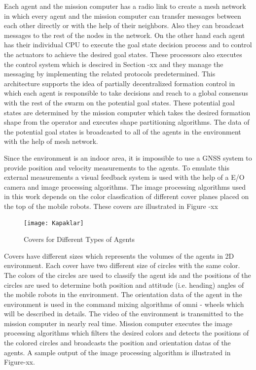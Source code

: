 \documentclass[twoside]{article}
\begin{document}
Each agent and the mission computer has a radio link to create a mesh network in which every agent and the mission computer can transfer messages between each other directly or with the help of their neighbors. Also they can broadcast messages to the rest of the nodes in the network.  On the other hand each agent has their individual CPU to execute the goal state decision process and to control the actuators to achieve the desired goal states. These processors also executes the control system which is descired in Section -xx and they manage the messaging by implementing the related protocols predetermined.  This architecture supports the idea of partially decentralized formation control in which each agent is responsible to take decisions and reach to a global consensus with the rest of the swarm on the potential goal states.  These potential goal states are determined by the mission computer which takes the desired formation shape from the operator and executes shape partitioning algorithms. The data of the potential goal states is broadcasted to all of the agents in the environment with the help of mesh network. 

Since the environment is an indoor area, it is impossible to use a GNSS system to provide position and velocity measurements to the agents. To emulate this external measurements a visual feedback system is used with the help of a E/O camera and image processing algorithms.  The image processing algorithms used in this work depends on the color classfication of different cover planes placed on the top of the mobile robots. These covers are illustrated in Figure -xx


		
			\begin{figure}[H]
				\caption{Covers for Different Types of Agents}
				\centerline{\texttt{[image: Kapaklar]}}
			\end{figure} 
		
		
		Covers have different sizes which represents the volumes of the agents in 2D environment. Each cover have two different size of circles with the same color. The colors of the circles are used to classify the agent ids and the positions of the circles are used to determine both position and attitude (i.e. heading) angles of the mobile robots in the environment. The orientation data of the agent in the environment is used in the command mixing algorithms of omni - wheels which will be described in details. The video of the environment is transmitted to the mission computer in nearly real time. Mission computer executes the image processing algorithms which filters the desired colors and detects the positions of the colored circles and broadcasts the position and orientation datas of the agents. A sample output of the image processing algorithm is illustrated in Figure-xx. 
		
\end{document}

